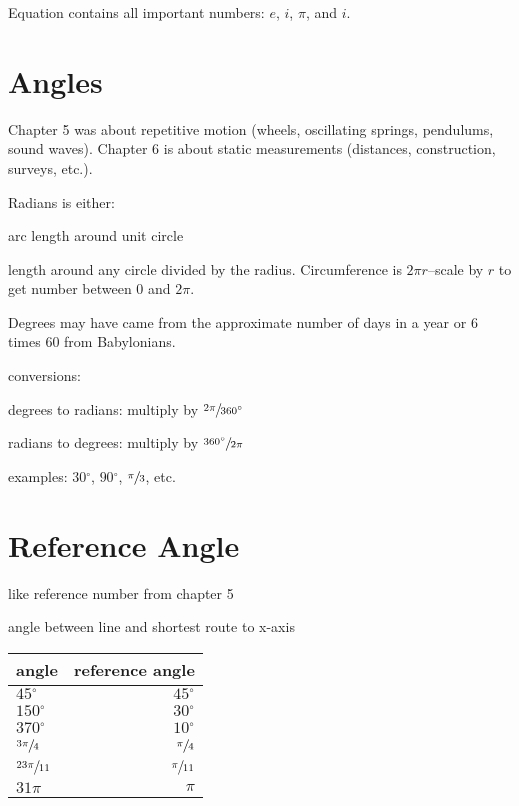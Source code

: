 \documentclass{exam}
\newcommand{\dg}{\ensuremath{^\circ}}
\begin{document}
  Equation contains all important numbers: $e$, $i$, $\pi$, and $i$.

  \section{Angles}

  Chapter 5 was about repetitive motion (wheels, oscillating springs, pendulums, sound waves).  Chapter 6 is about
  static measurements (distances, construction, surveys, etc.).

  Radians is either:
  \begin{itemize*}
    \item arc length around unit circle
    \item length around any circle divided by the radius.  Circumference is $2 \pi r$--scale by $r$ to get number
      between $0$ and $2 \pi$.
  \end{itemize*}

  Degrees may have came from the approximate number of days in a year or 6 times 60 from Babylonians.

  conversions:
  \begin{itemize*}
    \item degrees to radians: multiply by $\sfrac{2 \pi}{360 \dg}$
    \item radians to degrees: multiply by $\sfrac{360 \dg}{2 \pi}$
  \end{itemize*}

  examples: $30\dg$, $90\dg$, $\sfrac{\pi}{3}$, etc.

  \section{Reference Angle}
  \begin{itemize*}
    \item like reference number from chapter 5
    \item angle between line and shortest route to x-axis
  \end{itemize*}

  \begin{tabular}[H]{lr}
    \toprule
    angle                & reference angle \\
    \midrule
    $45 \dg$             & $45 \dg$ \\
    $150 \dg$            & $30 \dg$ \\
    $370 \dg$            & $10 \dg$ \\
    $\sfrac{3 \pi}{4}$   & $\sfrac{\pi}{4}$ \\
    $\sfrac{23 \pi}{11}$ & $\sfrac{\pi}{11}$ \\
    $31 \pi$             & $\pi$ \\
    \bottomrule
  \end{tabular}
\end{document}
